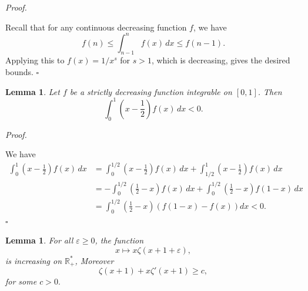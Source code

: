 \documentclass[10pt]{article}
\newtheorem{lemma}[theorem]{Lemma}
\renewenvironment{proof}[1][Proof]{%
  \noindent\textit{#1. }%
}{\hfill$\square$\vspace{4pt}}
\begin{document}
\begin{proof}
Recall that for any continuous decreasing function $f$, we have
\[
f(n) \leq \int_{n-1}^{n} f(x) \, dx \leq f(n-1).
\]
Applying this to $f(x) = 1/x^s$ for $s>1$, which is decreasing, gives the desired bounds.
\end{proof}
\begin{lemma}\label{mo}
    Let $f$ be a strictly decreasing function integrable on $[0,1]$. Then
\[
\int_0^1 \left(x - \frac{1}{2}\right) f(x)\,dx < 0.
\]
\end{lemma}
\begin{proof}
    We have \begin{align*}
        \int_0^1\left(x - \frac{1}{2}\right) f(x)\,dx&=\int_{0}^{1/2}\left(x - \frac{1}{2}\right) f(x)\,dx+\int_{1/2}^1\left(x - \frac{1}{2}\right) f(x)\,dx\\
        &=-\int_{0}^{1/2}\left( \frac{1}{2}-x\right) f(x)\,dx+\int_{0}^{1/2}\left(\frac{1}{2}-x\right) f(1-x)\,dx\\&=\int_{0}^{1/2}\left( \frac{1}{2}-x\right) \left(f(1-x)-f(x)\right)dx<0.
    \end{align*}
\end{proof}
\begin{lemma}\label{cr}
For all $\varepsilon \ge 0$, the function
\[
x \mapsto x \zeta(x+1+\varepsilon),
\]
is increasing on $\mathbb{R}_{+}^*$, Moreover $$\zeta(x+1)+x\zeta'(x+1)\geq c,$$
for some $c>0.$
\end{lemma}
\end{document}
